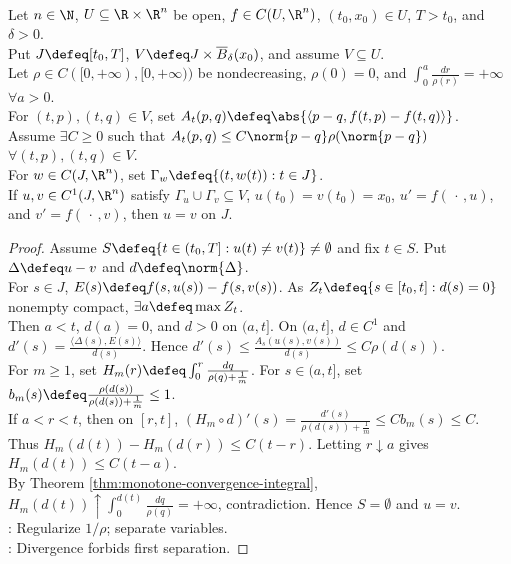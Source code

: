 \begin{theorem} \label{thm:osgood-uniqueness-criterion} \\
Let $n\in\N$, $U\subseteq\R\times\R^n$ be open, $f\in C(U,\R^n)$, $(t_0,x_0)\in U$, $T>t_0$, and $\delta>0$.\\
Put $J\defeq[t_0,T]$, $V\defeq J\times\overline B_\delta(x_0)$, and assume $V\subseteq U$.\\
Let $\rho\in C([0,+\infty),[0,+\infty))$ be nondecreasing, $\rho(0)=0$, and $\int_0^a\frac{dr}{\rho(r)}=+\infty$ $\forall a>0$.\\
 For $(t,p),(t,q)\in V$, set $A_t(p,q)\defeq\abs{\langle p-q,f(t,p)-f(t,q)\rangle}$.\\
Assume $\exists C\geq0$ such that $A_t(p,q)\leq C\norm{p-q}\rho(\norm{p-q})$ $\forall (t,p),(t,q)\in V$.\\
For $w\in C(J,\R^n)$, set $\Gamma_w\defeq\{(t,w(t)):t\in J\}$.\\
If $u,v\in C^1(J,\R^n)$ satisfy $\Gamma_u\cup\Gamma_v\subseteq V$, $u(t_0)=v(t_0)=x_0$, $u'=f(\,\cdot\,,u)$, and $v'=f(\,\cdot\,,v)$, then $u=v$ on $J$.
\begin{proof}
Assume $S\defeq\{t\in(t_0,T]:u(t)\neq v(t)\}\neq\emptyset$ and fix $t\in S$. Put $\Delta\defeq u-v$ and $d\defeq\norm{\Delta}$.\\
For $s\in J$, $E(s)\defeq f(s,u(s))-f(s,v(s))$. As $Z_t\defeq\{s\in[t_0,t]:d(s)=0\}$ nonempty compact, $\exists a\defeq\max Z_t$.\\
Then $a<t$, $d(a)=0$, and $d>0$ on $(a,t]$. On $(a,t]$, $d\in C^1$ and $d'(s)=\frac{\langle\Delta(s),E(s)\rangle}{d(s)}$. Hence $d'(s)\leq\frac{A_s(u(s),v(s))}{d(s)}\leq C\rho(d(s))$.\\
For $m\geq1$, set $H_m(r)\defeq\int_0^r\frac{dq}{\rho(q)+\frac{1}{m}}$. For $s\in(a,t]$, set $b_m(s)\defeq\frac{\rho(d(s))}{\rho(d(s))+\frac{1}{m}}\leq1$.\\
If $a<r<t$, then on $[r,t]$, $(H_m\circ d)'(s)=\frac{d'(s)}{\rho(d(s))+\frac{1}{m}}\leq Cb_m(s)\leq C$.\\
Thus $H_m(d(t))-H_m(d(r))\leq C(t-r)$. Letting $r\downarrow a$ gives $H_m(d(t))\leq C(t-a)$.\\
By Theorem \ref{thm:monotone-convergence-integral}, $H_m(d(t))\uparrow\int_0^{d(t)}\frac{dq}{\rho(q)}=+\infty$, contradiction. Hence $S=\emptyset$ and $u=v$.\\
: Regularize $1/\rho$; separate variables.\\
: Divergence forbids first separation.
\end{proof}
\end{theorem}

